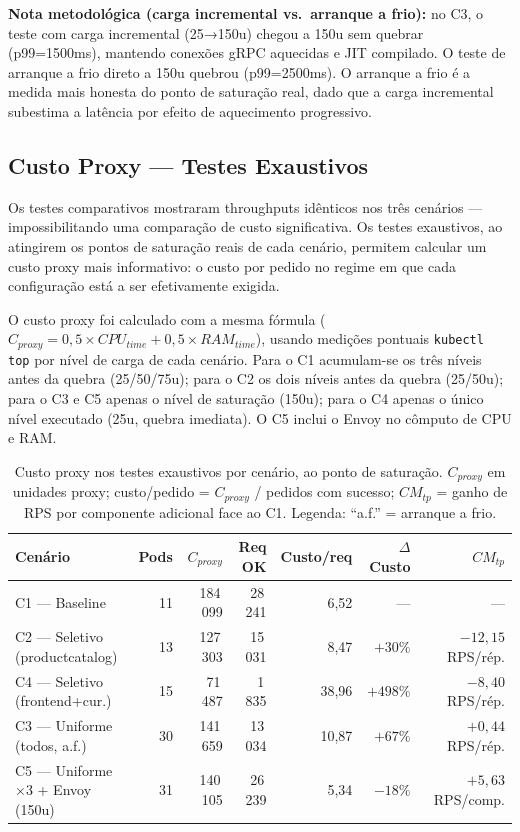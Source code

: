 \documentclass[manuscript,screen,review]{acmart}
\begin{document}
\textbf{Nota metodológica (carga incremental vs.\ arranque a frio):} no C3, o teste com carga incremental (25→150u) chegou a 150u sem quebrar (p99=1500ms), mantendo conexões gRPC aquecidas e JIT compilado. O teste de arranque a frio direto a 150u quebrou (p99=2500ms). O arranque a frio é a medida mais honesta do ponto de saturação real, dado que a carga incremental subestima a latência por efeito de aquecimento progressivo.

\subsection{Custo Proxy — Testes Exaustivos}
\label{subsec:custo-exaustivo}

Os testes comparativos mostraram throughputs idênticos nos três cenários — impossibilitando uma comparação de custo significativa. Os testes exaustivos, ao atingirem os pontos de saturação reais de cada cenário, permitem calcular um custo proxy mais informativo: o custo por pedido no regime em que cada configuração está a ser efetivamente exigida.

O custo proxy foi calculado com a mesma fórmula ($C_{proxy} = 0{,}5 \times CPU_{time} + 0{,}5 \times RAM_{time}$), usando medições pontuais \texttt{kubectl top} por nível de carga de cada cenário. Para o C1 acumulam-se os três níveis antes da quebra (25/50/75u); para o C2 os dois níveis antes da quebra (25/50u); para o C3 e C5 apenas o nível de saturação (150u); para o C4 apenas o único nível executado (25u, quebra imediata). O C5 inclui o Envoy no cômputo de CPU e RAM.

\begin{table}[t]
\caption{Custo proxy nos testes exaustivos por cenário, ao ponto de saturação. $C_{proxy}$ em unidades proxy; custo/pedido = $C_{proxy}$ / pedidos com sucesso; $CM_{tp}$ = ganho de RPS por componente adicional face ao C1. Legenda: ``a.f.'' = arranque a frio.}
\label{tab:custo-exaustivo}
\begin{tabular}{lrrrrrr}
\toprule
\textbf{Cenário} & \textbf{Pods} & \textbf{$C_{proxy}$} & \textbf{Req OK} & \textbf{Custo/req} & \textbf{$\Delta$Custo} & \textbf{$CM_{tp}$} \\
\midrule
C1 — Baseline                    & 11 & 184\,099 & 28\,241 &  6{,}52 & —        & — \\
C2 — Seletivo (productcatalog)   & 13 & 127\,303 & 15\,031 &  8{,}47 & $+30\%$  & $-12{,}15$~RPS/rép. \\
C4 — Seletivo (frontend+cur.)    & 15 &  71\,487 &  1\,835 & 38{,}96 & $+498\%$ & $-8{,}40$~RPS/rép. \\
C3 — Uniforme (todos, a.f.)      & 30 & 141\,659 & 13\,034 & 10{,}87 & $+67\%$  & $+0{,}44$~RPS/rép. \\
C5 — Uniforme ×3 + Envoy (150u) & 31 & 140\,105 & 26\,239 &  5{,}34 & $-18\%$  & $+5{,}63$~RPS/comp. \\
\bottomrule
\end{tabular}
\end{table}
\end{document}
